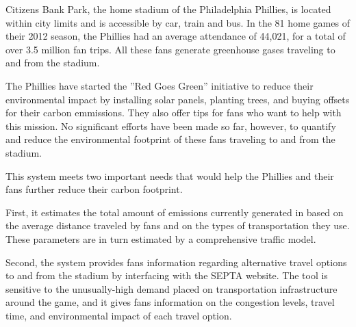 
Citizens Bank Park, the home stadium of the Philadelphia Phillies, is located 
within city limits and is accessible by car, train and bus. In the 81 home games
of their 2012 season, the Phillies  had an average attendance of 44,021, for a 
total of over 3.5 million fan trips. All these fans generate greenhouse gases 
traveling to and from the stadium.
 
The Phillies have started the ”Red Goes Green” initiative to reduce their 
environmental impact by installing  solar panels, planting trees, and buying 
offsets for their carbon emmissions. They also offer tips for fans who want to 
help with this mission.  No significant  efforts have been made so far, however,
to quantify and reduce the environmental footprint  of these fans traveling to 
and from the stadium.
 
This system meets two important  needs that would  help the Phillies  and their 
fans further reduce their carbon footprint.
 
First, it estimates the total amount of emissions currently  generated in based 
on the average distance traveled by fans and on the types of transportation they 
use. These parameters are in turn estimated by a comprehensive  traffic model.
 
Second, the system provides fans information  regarding alternative travel 
options to and from the stadium by interfacing with the SEPTA website. The tool
is sensitive to the unusually-high demand placed on transportation 
infrastructure  around the game, and it gives fans information on the congestion
 levels, travel time, and environmental impact of each travel option.
